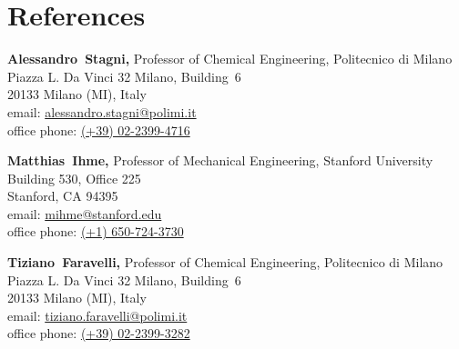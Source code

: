 \section{\sc References}

\vspace*{.05in}
\parbox{\textwidth}
{
    {\bf Alessandro~Stagni,} Professor of Chemical Engineering, Politecnico di Milano \\
    Piazza L. Da Vinci 32 Milano, Building\ 6 \\
    20133 Milano (MI), Italy \\
    email: \href{mailto:alessandro.stagni@polimi.it}{alessandro.stagni@polimi.it} \\
    office phone: \href{tel:+390223994716}{(+39) 02-2399-4716}
}
\par
\parbox{\textwidth}
{
    {\bf Matthias~Ihme,} Professor of Mechanical Engineering, Stanford University \\
    Building 530, Office 225 \\
    Stanford, CA 94395\\
    email: \href{mailto:mihme@stanford.edu}{mihme@stanford.edu}\\
    office phone: \href{tel:+16507243730}{(+1) 650-724-3730}
}
\par
\parbox{\textwidth}
{
    {\bf Tiziano~Faravelli,} Professor of Chemical Engineering, Politecnico di Milano \\
    Piazza L. Da Vinci 32 Milano, Building\ 6 \\
    20133 Milano (MI), Italy \\
    email: \href{mailto:tiziano.faravelli@polimi.it}{tiziano.faravelli@polimi.it} \\
    office phone: \href{tel:+390223993282}{(+39) 02-2399-3282}
}
